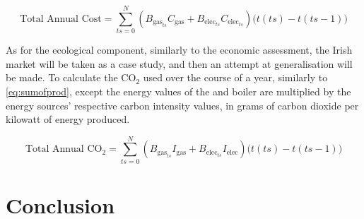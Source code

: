 \begin{equation}
    \text{Total Annual Cost} = \sum_{\mathit{ts}=0}^{N} \left(B_{\text{gas}_\mathit{ts}}  C_\text{gas} + B_{\text{elec}_\mathit{ts}} C_{\text{elec}_\mathit{ts}} \right)\bigl(t(\mathit{ts})-t(\mathit{ts}-1)\bigr)\label{eq:sumofprod}
\end{equation}

As for the ecological component, similarly to the economic assessment, the Irish market will be taken as a case study, and then an attempt at generalisation will be made. To calculate the $\text{CO}_2$ used over the course of a year, similarly to \cref{eq:sumofprod}, except the energy values of the \HP and boiler are multiplied by the energy sources' respective carbon intensity values, in grams of carbon dioxide per kilowatt of energy produced. 

\begin{equation}
    \text{Total Annual CO}_2 = \sum_{\mathit{ts}=0}^{N} \left(B_{\text{gas}_\mathit{ts}} I_\text{gas} + B_{\text{elec}_\mathit{ts}} I_{\text{elec}} \right)\bigl(t(\mathit{ts})-t(\mathit{ts}-1)\bigr)\label{eq:sumofprodeco}
\end{equation}

\section{Conclusion}\label{sec:methodconclusion}


